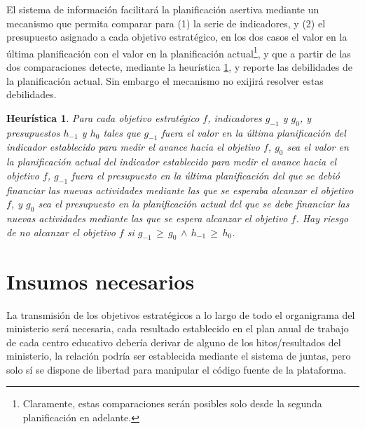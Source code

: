\documentclass{article}
\newtheorem{heuristic}[theorem]{Heur\'istica}
\begin{document}
\begin{multicols}{6}[]
El sistema de informaci\'on facilitar\'a la planificaci\'on asertiva mediante un mecanismo que permita comparar para (1) la serie de indicadores, y (2) el presupuesto asignado a cada objetivo estrat\'egico, en los dos casos el valor en la \'ultima planificaci\'on con el valor en la planificaci\'on actual\footnote{Claramente, estas comparaciones ser\'an posibles solo desde la segunda planificaci\'on en adelante.}, y que a partir de las dos comparaciones detecte, mediante la heur\'istica \ref{heur}, y reporte las debilidades de la planificaci\'on actual. Sin embargo el mecanismo no exijir\'a resolver estas debilidades.

\begin{heuristic} \label{heur}
 Para cada objetivo estrat\'egico $f$, indicadores $g_{-1}$ y $g_{0}$, y presupuestos $h_{-1}$ y $h_{0}$ tales que $g_{-1}$ fuera el valor en la \'ultima planificaci\'on del indicador establecido para medir el avance hacia el objetivo $f$, $g_{0}$ sea el valor en la planificaci\'on actual del indicador establecido para medir el avance hacia el objetivo $f$, $g_{-1}$ fuera el presupuesto en la \'ultima planificaci\'on del que se debi\'o financiar las nuevas actividades mediante las que se esperaba alcanzar el objetivo $f$, y $g_{0}$ sea el presupuesto en la planificaci\'on actual del que se debe financiar las nuevas actividades mediante las que se espera alcanzar el objetivo $f$. Hay riesgo de no alcanzar el objetivo $f$ si $g_{-1}\,\geq\,g_{0}\,\land\,h_{-1}\,\geq\,h_{0}$.
\end{heuristic}


\section{Insumos necesarios}


La transmisi\'on de los objetivos estrat\'egicos a lo largo de todo el organigrama del ministerio ser\'a necesaria, cada resultado establecido en el plan anual de trabajo de cada centro educativo deber\'ia derivar de alguno de los hitos/resultados del ministerio, la relaci\'on podr\'ia ser establecida mediante el sistema de juntas, pero solo s\'i se dispone de libertad para manipular el c\'odigo fuente de la plataforma.


\end{multicols}
\end{document}
